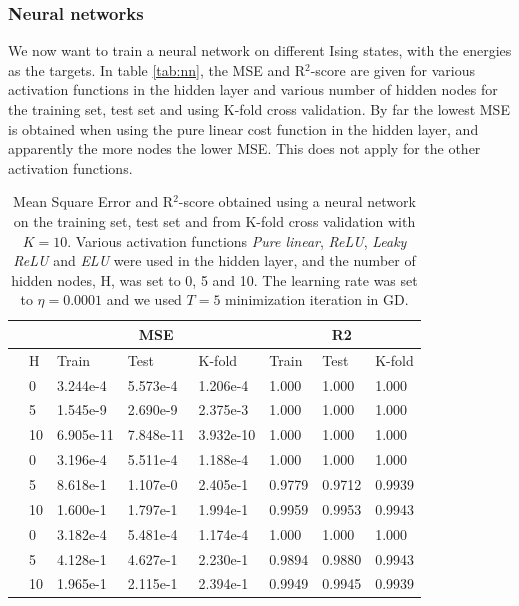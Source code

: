 \subsubsection{Neural networks}
We now want to train a neural network on different Ising states, with the energies as the targets. In table \eqref{tab:nn}, the MSE and R$^2$-score are given for various activation functions in the hidden layer and various number of hidden nodes for the training set, test set and using K-fold cross validation. By far the lowest MSE is obtained when using the pure linear cost function in the hidden layer, and apparently the more nodes the lower MSE. This does not apply for the other activation functions. 
\begin{table} [H]
	\caption{Mean Square Error and R$^2$-score obtained using a neural network on the training set, test set and from K-fold cross validation with $K=10$. Various activation functions \textit{Pure linear}, \textit{ReLU}, \textit{Leaky ReLU} and \textit{ELU} were used in the hidden layer, and the number of hidden nodes, H, was set to 0, 5 and 10. The learning rate was set to $\eta=0.0001$ and we used $T=5$ minimization iteration in GD.}
	\begin{tabularx}{\textwidth}{l|l|XXX|XXX} \hline\hline
		\label{tab:nn}
		&& \multicolumn{3}{c}{\textbf{MSE}}&\multicolumn{3}{c}{\textbf{R2}}\\ \hline
		&H&Train&Test&K-fold&Train&Test&K-fold\\ \hline
		
		\parbox[t]{2mm}{}
		&0 & 3.244e-4 & 5.573e-4 & 1.206e-4 & 1.000 & 1.000 & 1.000\\
		&5 & 1.545e-9 & 2.690e-9 & 2.375e-3 & 1.000 & 1.000 & 1.000 \\
		&10 & 6.905e-11 & 7.848e-11 & 3.932e-10 & 1.000 & 1.000 & 1.000\\ \hline
		
		\parbox[t]{2mm}{}
		&0 & 3.196e-4 & 5.511e-4 & 1.188e-4 & 1.000 & 1.000 & 1.000 \\
		&5 & 8.618e-1 & 1.107e-0 & 2.405e-1 & 0.9779 & 0.9712 & 0.9939 \\
		&10 & 1.600e-1 & 1.797e-1 & 1.994e-1 & 0.9959 & 0.9953 & 0.9943\\ \hline
		
		\parbox[t]{2mm}{}
		&0 & 3.182e-4 & 5.481e-4 & 1.174e-4 & 1.000 & 1.000 & 1.000 \\
		&5 & 4.128e-1 & 4.627e-1 & 2.230e-1 & 0.9894 & 0.9880 & 0.9943\\
		&10 & 1.965e-1 & 2.115e-1 & 2.394e-1 & 0.9949 & 0.9945 & 0.9939\\ \hline
		

\end{tabularx}
\end{table}
